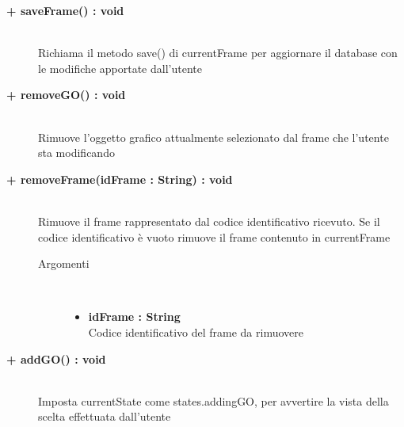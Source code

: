 \begin{description}
\begin{description}
\begin{description}
		\end{description}
	\end{description}
	
	
	\begin{description}
		\item[\textbf{\color{blue} + saveFrame() : void	}] \hfill \\
			Richiama il metodo save() di currentFrame per aggiornare il database con le modifiche apportate dall'utente
		
	\end{description}
	
	\begin{description}
		\item[\textbf{\color{blue}+ removeGO() : void	}] \hfill \\
			Rimuove l'oggetto grafico attualmente selezionato dal frame che l'utente sta modificando
		
	\end{description}
	
	
	\begin{description}
		\item[\textbf{\color{blue}+ removeFrame(idFrame : String) : void 	}] \hfill \\
			Rimuove il frame rappresentato dal codice identificativo ricevuto. Se il codice identificativo è vuoto rimuove il frame contenuto in currentFrame
			
		\begin{description}
			\item[Argomenti] \hfill \\
				\begin{itemize}
				
					\item \textbf{idFrame : String	} \hfill \\
					Codice identificativo del frame da rimuovere		
				\end{itemize}
				
		\end{description}
	\end{description}
	
	\begin{description}
		\item[\textbf{\color{blue}+ addGO() : void	}] \hfill \\
			Imposta currentState come states.addingGO, per avvertire la vista della scelta effettuata dall'utente
		

\end{description}
\end{description}
